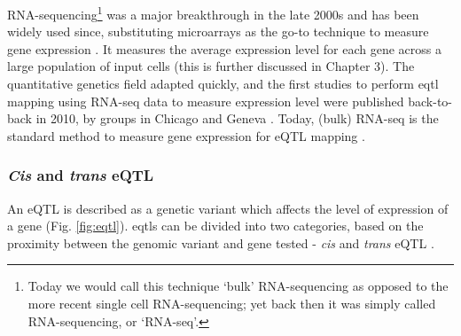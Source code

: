 RNA-sequencing\footnote{Today we would call this technique `bulk' RNA-sequencing as opposed to the more recent single cell RNA-sequencing; yet back then it was simply called RNA-sequencing, or `RNA-seq'.} was a major breakthrough in the late 2000s 
and has been widely used since, substituting microarrays as the go-to technique to measure gene expression \cite{weber2015discovering}.
It measures the average expression level for each gene across a large population 
of input cells (this is further discussed in Chapter 3).
The quantitative genetics field adapted quickly, and the first studies to perform \gls{eqtl} mapping using RNA-seq data to measure expression level were published back-to-back in 2010, by groups in Chicago and Geneva
\cite{montgomery2010transcriptome, pickrell2010understanding}.
Today, (bulk) RNA-seq is the standard method to measure gene expression for eQTL mapping \cite{lappalainen2013transcriptome, gtex2015genotype, chen2016genetic}. 

\subsubsection{\textit{Cis} and \textit{trans} eQTL}


An eQTL is described as a genetic variant which affects the level of expression of a gene (Fig. \ref{fig:eqtl}).
\glspl{eqtl} can be divided into two categories, based on the proximity between the genomic variant and gene tested - \textit{cis} and \textit{trans} eQTL \cite{westra2014genome}.


